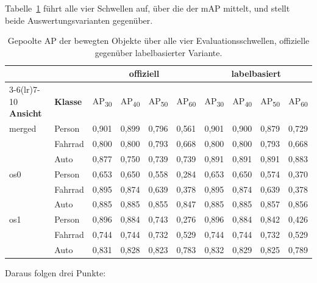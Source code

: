 Tabelle~\ref{tab:alle-schwellen} führt alle vier Schwellen auf, über die der mAP mittelt, und stellt beide Auswertungsvarianten gegenüber.

\begin{table}[H]
\centering
{\small\setlength{\tabcolsep}{4pt}
\begin{tabular}{llcccccccc}
\toprule
& & \multicolumn{4}{c}{\textbf{offiziell}} & \multicolumn{4}{c}{\textbf{labelbasiert}} \\
\cmidrule(lr){3-6}\cmidrule(lr){7-10}
\textbf{Ansicht} & \textbf{Klasse} & AP\textsubscript{30} & AP\textsubscript{40} & AP\textsubscript{50} & AP\textsubscript{60} & AP\textsubscript{30} & AP\textsubscript{40} & AP\textsubscript{50} & AP\textsubscript{60} \\
\midrule
merged & Person  & 0{,}901 & 0{,}899 & 0{,}796 & 0{,}561 & 0{,}901 & 0{,}900 & 0{,}879 & 0{,}729 \\
       & Fahrrad & 0{,}800 & 0{,}800 & 0{,}793 & 0{,}668 & 0{,}800 & 0{,}800 & 0{,}793 & 0{,}668 \\
       & Auto    & 0{,}877 & 0{,}750 & 0{,}739 & 0{,}739 & 0{,}891 & 0{,}891 & 0{,}891 & 0{,}883 \\
\midrule
os0    & Person  & 0{,}653 & 0{,}650 & 0{,}558 & 0{,}284 & 0{,}653 & 0{,}650 & 0{,}574 & 0{,}370 \\
       & Fahrrad & 0{,}895 & 0{,}874 & 0{,}639 & 0{,}378 & 0{,}895 & 0{,}874 & 0{,}639 & 0{,}378 \\
       & Auto    & 0{,}885 & 0{,}885 & 0{,}855 & 0{,}847 & 0{,}885 & 0{,}885 & 0{,}857 & 0{,}856 \\
\midrule
os1    & Person  & 0{,}896 & 0{,}884 & 0{,}743 & 0{,}276 & 0{,}896 & 0{,}884 & 0{,}842 & 0{,}426 \\
       & Fahrrad & 0{,}744 & 0{,}744 & 0{,}732 & 0{,}529 & 0{,}744 & 0{,}744 & 0{,}732 & 0{,}529 \\
       & Auto    & 0{,}831 & 0{,}828 & 0{,}823 & 0{,}783 & 0{,}832 & 0{,}829 & 0{,}825 & 0{,}789 \\
\bottomrule
\end{tabular}}
\caption{Gepoolte AP der bewegten Objekte über alle vier Evaluationsschwellen, offizielle gegenüber labelbasierter Variante.}
\label{tab:alle-schwellen}
\end{table}

Daraus folgen drei Punkte:

